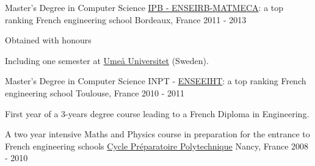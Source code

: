 
	\begin{cventries}
	
		\cventry
			{Master's Degree in Computer Science}
			{\href{https://enseirb-matmeca.bordeaux-inp.fr/fr}{IPB - ENSEIRB-MATMECA}: a top ranking French engineering school}
			{Bordeaux, France}
			{2011 - 2013}
			{	
				\begin{cvitems}
					\item Obtained with honours
					\item Including one semester at \href{http://www.umu.se}{Ume\aa{} Universitet} (Sweden).
				\end{cvitems}
			}
		
		
		\cventry
			{Master's Degree in Computer Science}
			{INPT - \href{http://www.enseeiht.fr}{ENSEEIHT}: a top ranking French engineering school}
			{Toulouse, France}
			{2010 - 2011}
			{
				\begin{cvitems}
					\item First year of a 3-years degree course leading to a French Diploma in Engineering.
				\end{cvitems}
			}
		
		\cventry
			{A two year intensive Maths and Physics course in preparation for the entrance to French engineering schools}
			{\href{http://www.la-prepa-des-inp.fr}{Cycle Préparatoire Polytechnique}}
			{Nancy, France}
			{2008 - 2010}
			{}
		
		
	
	\end{cventries}
